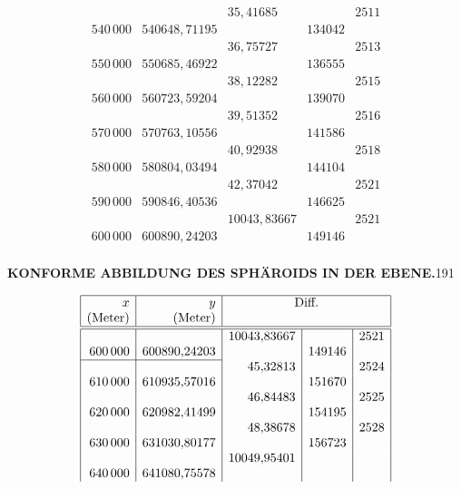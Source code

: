 {\[\begin{array}{|r|r|r|r|r|}
&&35{,}41685&&2511\\
540\,000&540648{,}71195&&134042&\\
&&36{,}75727&&2513\\
550\,000&550685{,}46922&&136555&\\
&&38{,}12282&&2515\\
560\,000&560723{,}59204&&139070&\\
&&39{,}51352&&2516\\
570\,000&570763{,}10556&&141586&\\
&&40{,}92938&&2518\\
580\,000&580804{,}03494&&144104&\\
&&42{,}37042&&2521\\
590\,000&590846{,}40536&&146625&\\
&&10043{,}83667&&2521\\
600\,000&600890{,}24203&&149146&\\
\end{array}\]
}


\par\clearpage
\noindent\null\hfill{\small\textbf{KONFORME ABBILDUNG DES SPHÄROIDS IN DER EBENE.}}\hfill191\par\medskip
{\small\renewcommand{\arraystretch}{.85}
\[\begin{array}{|r|r|r|r|r|}\hline
x&y&\multicolumn{3}{c|}{\text{Diff.}}\\
\text{(Meter)}&\text{(Meter)}&\multicolumn{3}{c|}{}\\\hline\hline
&&10043{,}83667&&2521\\
600\,000&600890{,}24203&&149146&\\
\cline{1-2}
&&45{,}32813&&2524\\
610\,000&610935{,}57016&&151670&\\
&&46{,}84483&&2525\\
620\,000&620982{,}41499&&154195&\\
&&48{,}38678&&2528\\
630\,000&631030{,}80177&&156723&\\
&&10049{,}95401&&\\
640\,000&641080{,}75578&&&\\
\end{array}\]
}

